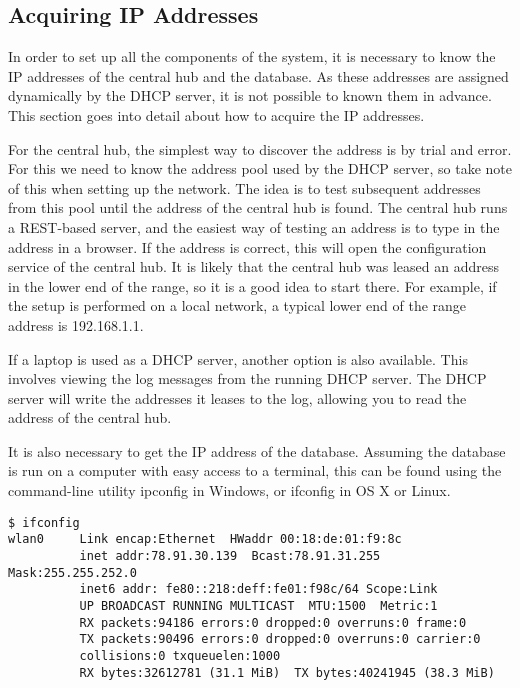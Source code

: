 \documentclass[../document.tex]{subfiles}
\begin{document}
\subsection{Acquiring IP Addresses}
In order to set up all the components of the system, it is necessary to know the IP addresses of the central hub and the database. As these addresses are assigned dynamically by the DHCP server, it is not possible to known them in advance. This section goes into detail about how to acquire the IP addresses.

For the central hub, the simplest way to discover the address is by trial and error. For this we need to know the address pool used by the DHCP server, so take note of this when setting up the network. The idea is to test subsequent addresses from this pool until the address of the central hub is found. The central hub runs a REST-based server, and the easiest way of testing an address is to type in the address in a browser. If the address is correct, this will open the configuration service of the central hub. It is likely that the central hub was leased an address in the lower end of the range, so it is a good idea to start there. For example, if the setup is performed on a local network, a typical lower end of the range address is 192.168.1.1.

If a laptop is used as a DHCP server, another option is also available. This involves viewing the log messages from the running DHCP server. The DHCP server will write the addresses it leases to the log, allowing you to read the address of the central hub.

It is also necessary to get the IP address of the database. Assuming the database is run on a computer with easy access to a terminal, this can be found using the command-line utility ipconfig in Windows, or ifconfig in OS X or Linux.
\begin{lstlisting}[caption=Example output of the ifconfig command in Linux]
$ ifconfig
wlan0     Link encap:Ethernet  HWaddr 00:18:de:01:f9:8c  
          inet addr:78.91.30.139  Bcast:78.91.31.255  Mask:255.255.252.0
          inet6 addr: fe80::218:deff:fe01:f98c/64 Scope:Link
          UP BROADCAST RUNNING MULTICAST  MTU:1500  Metric:1
          RX packets:94186 errors:0 dropped:0 overruns:0 frame:0
          TX packets:90496 errors:0 dropped:0 overruns:0 carrier:0
          collisions:0 txqueuelen:1000 
          RX bytes:32612781 (31.1 MiB)  TX bytes:40241945 (38.3 MiB)
\end{lstlisting}
\end{document}
